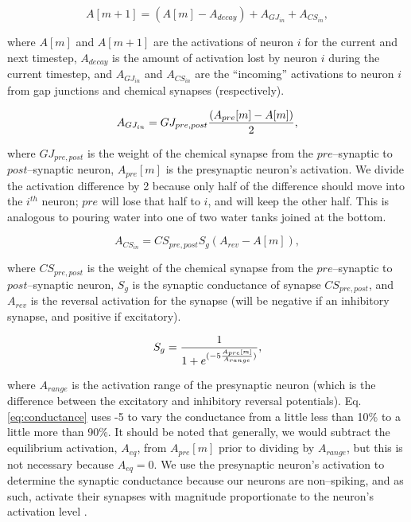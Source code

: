 \documentclass[letterpaper]{article}
\begin{document}
\begin{equation}
    A[m+1] = (A[m] - A_{decay}) + A_{GJ_{in}} + A_{CS_{in}},
\end{equation}

where $A[m]$ and $A[m+1]$ are the activations of neuron $i$ for the current and next timestep, $A_{decay}$ is the amount of activation lost by neuron $i$ during the current timestep, and $A_{GJ_{in}}$ and $A_{CS_{in}}$ are the ``incoming'' activations to neuron $i$ from gap junctions and chemical synapses (respectively).

\begin{equation}
    A_{GJ_{in}} =  GJ_{pre,post} {(A_{pre}[m] - A[m]) \over 2},
\end{equation}

where $GJ_{pre,post}$ is the weight of the chemical synapse from the $pre$--synaptic to $post$--synaptic neuron, $A_{pre}[m]$ is the presynaptic neuron's activation. We divide the activation difference by 2 because only half of the difference should move into the $i^{th}$ neuron; $pre$ will lose that half to $i$, and will keep the other half. This is analogous to pouring water into one of two water tanks joined at the bottom.

\begin{equation}
    A_{CS_{in}} =  CS_{pre,post} S_g  (A_{rev} - A[m]),
\end{equation}

where $CS_{pre,post}$ is the weight of the chemical synapse from the $pre$--synaptic to $post$--synaptic neuron, $S_g$ is the synaptic conductance of synapse $CS_{pre,post}$, and $A_{rev}$ is the reversal activation for the synapse (will be negative if an inhibitory synapse, and positive if excitatory).

\begin{equation}
    \label{eq:conductance}
    S_g = {1 \over { 1 + e^{(-5 { A_{pre}[m] \over A_{range} } )} }},
\end{equation}

where $A_{range}$ is the activation range of the presynaptic neuron (which is the difference between the excitatory and inhibitory reversal potentials). Eq. \ref{eq:conductance} uses -5 to vary the conductance from a little less than 10\% to a little more than 90\%.
It should be noted that generally, we would subtract the equilibrium activation, $A_{eq}$, from $A_{pre}[m]$ prior to dividing by $A_{range}$, but this is not necessary because $A_{eq} = 0$.
We use the presynaptic neuron's activation to determine the synaptic conductance because our neurons are non--spiking, and as such, activate their synapses with magnitude  proportionate to the neuron's activation level \citep{Wicks1996}.
\end{document}
